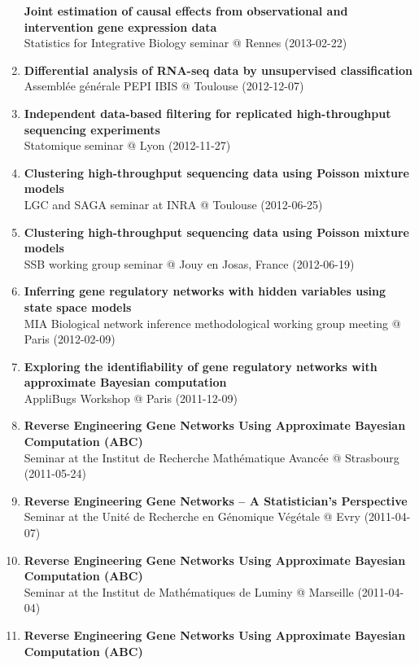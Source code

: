 \documentclass[11pt, a4paper]{awesome-cv}
\begin{document}
\begin{enumerate}
  \textbf{Joint estimation of causal effects from observational and
  intervention gene expression data}\\
  Statistics for Integrative Biology seminar @ Rennes (2013-02-22)
\item
  \textbf{Differential analysis of RNA-seq data by unsupervised
  classification}\\
  Assemblée générale PEPI IBIS @ Toulouse (2012-12-07)
\item
  \textbf{Independent data-based filtering for replicated
  high-throughput sequencing experiments}\\
  Statomique seminar @ Lyon (2012-11-27)
\item
  \textbf{Clustering high-throughput sequencing data using Poisson
  mixture models}\\
  LGC and SAGA seminar at INRA @ Toulouse (2012-06-25)
\item
  \textbf{Clustering high-throughput sequencing data using Poisson
  mixture models}\\
  SSB working group seminar @ Jouy en Josas, France (2012-06-19)
\item
  \textbf{Inferring gene regulatory networks with hidden variables using
  state space models}\\
  MIA Biological network inference methodological working group meeting
  @ Paris (2012-02-09)
\item
  \textbf{Exploring the identifiability of gene regulatory networks with
  approximate Bayesian computation}\\
  AppliBugs Workshop @ Paris (2011-12-09)
\item
  \textbf{Reverse Engineering Gene Networks Using Approximate Bayesian
  Computation (ABC)}\\
  Seminar at the Institut de Recherche Mathématique Avancée @ Strasbourg
  (2011-05-24)
\item
  \textbf{Reverse Engineering Gene Networks -- A Statistician's
  Perspective}\\
  Seminar at the Unité de Recherche en Génomique Végétale @ Evry
  (2011-04-07)
\item
  \textbf{Reverse Engineering Gene Networks Using Approximate Bayesian
  Computation (ABC)}\\
  Seminar at the Institut de Mathématiques de Luminy @ Marseille
  (2011-04-04)
\item
  \textbf{Reverse Engineering Gene Networks Using Approximate Bayesian
  Computation (ABC)}\\

\end{enumerate}
\end{document}
